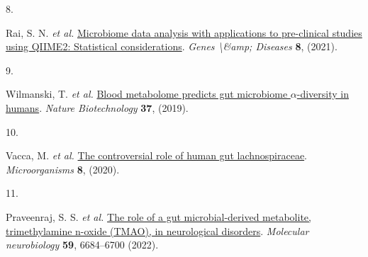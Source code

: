 \documentclass[
]{article}
\newlength{\cslhangindent}
\newlength{\csllabelwidth}
\newlength{\cslentryspacingunit} %
\newenvironment{CSLReferences}[2] %
 {%
  \setlength{\parindent}{0pt}
  \ifodd #1
  \let\oldpar\par
  \def\par{\hangindent=\cslhangindent\oldpar}
  \fi
  \setlength{\parskip}{#2\cslentryspacingunit}
 }%
 {}
\newcommand{\CSLLeftMargin}[1]{\parbox[t]{\csllabelwidth}{#1}}
\newcommand{\CSLRightInline}[1]{\parbox[t]{\linewidth - \csllabelwidth}{#1}\break}
\begin{document}
\begin{CSLReferences}{0}{0}
\leavevmode{}%
\CSLLeftMargin{8. }%
\CSLRightInline{Rai, S. N. \emph{et al.} \href{https://doi.org/10.1016/j.gendis.2019.12.005}{Microbiome data analysis with applications to pre-clinical studies using QIIME2: Statistical considerations}. \emph{Genes \textbackslash\&amp; Diseases} \textbf{8}, (2021).}

\leavevmode{}%
\CSLLeftMargin{9. }%
\CSLRightInline{Wilmanski, T. \emph{et al.} \href{https://doi.org/10.1038/s41587-019-0233-9}{Blood metabolome predicts gut microbiome \(\alpha\)-diversity in humans}. \emph{Nature Biotechnology} \textbf{37}, (2019).}

\leavevmode{}%
\CSLLeftMargin{10. }%
\CSLRightInline{Vacca, M. \emph{et al.} \href{https://doi.org/10.3390/microorganisms8040573}{The controversial role of human gut lachnospiraceae}. \emph{Microorganisms} \textbf{8}, (2020).}

\leavevmode{}%
\CSLLeftMargin{11. }%
\CSLRightInline{Praveenraj, S. S. \emph{et al.} \href{https://doi.org/10.1007/s12035-022-02990-5}{The role of a gut microbial-derived metabolite, trimethylamine n-oxide (TMAO), in neurological disorders}. \emph{Molecular neurobiology} \textbf{59}, 6684--6700 (2022).}

\end{CSLReferences}
\end{document}
